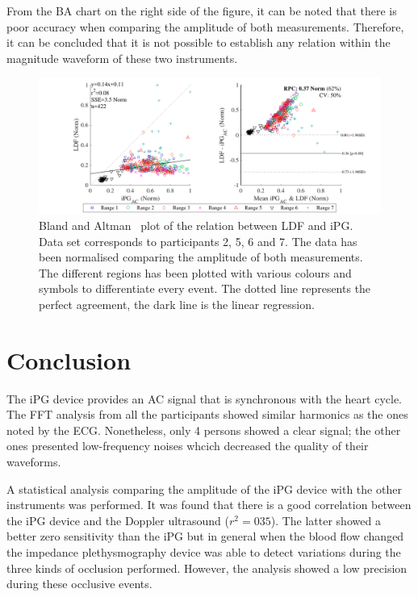 From the BA chart on the right side of the figure, it can be noted that there is poor accuracy when comparing the amplitude of both measurements. Therefore, it can be concluded that it is not possible to establish any relation within the magnitude waveform of these two instruments.

\begin{figure}[!htpb]
	\includegraphics[width=1\textwidth,keepaspectratio]{figure4}    
	\caption[Bland and Altman plot of the relation between LDF and iPG]{Bland and Altman~\cite{bland1986statistical} plot of the relation between LDF and iPG. Data set corresponds to participants 2, 5, 6 and 7. The data has been normalised comparing the amplitude of both measurements. The different regions has been plotted with various colours and symbols to differentiate every event. The dotted line represents the perfect agreement, the dark line is the linear regression.}
	\label{fig:corr LDF}
\end{figure}

\section{Conclusion}  %
\label{section correlation 5}
The iPG device provides an AC signal that is synchronous with the heart cycle. The FFT analysis from all the participants showed similar harmonics as the ones noted by the ECG. Nonetheless, only 4 persons showed a clear signal; the other ones presented low-frequency noises whcich decreased the quality of their waveforms. 

A statistical analysis comparing the amplitude of the iPG device with the other instruments was performed.  It was found that there is a good correlation between the iPG device and the Doppler ultrasound ($r^2 = 035$). The latter showed a better zero sensitivity than the iPG but in general when the blood flow changed the impedance plethysmography device was able to detect variations during the three kinds of occlusion performed.  However, the analysis showed a low precision during these occlusive events. 

